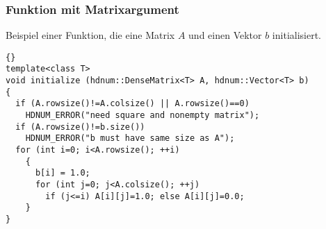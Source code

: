 \begin{frame}[fragile]
\frametitle{Funktion mit Matrixargument}
Beispiel einer Funktion, die eine Matrix $A$ und einen Vektor $b$
initialisiert.

{\footnotesize{\begin{lstlisting}{}
template<class T>
void initialize (hdnum::DenseMatrix<T> A, hdnum::Vector<T> b)
{
  if (A.rowsize()!=A.colsize() || A.rowsize()==0)
    HDNUM_ERROR("need square and nonempty matrix");
  if (A.rowsize()!=b.size())
    HDNUM_ERROR("b must have same size as A");
  for (int i=0; i<A.rowsize(); ++i)
    {
      b[i] = 1.0;
      for (int j=0; j<A.colsize(); ++j)
        if (j<=i) A[i][j]=1.0; else A[i][j]=0.0;
    }
}
\end{lstlisting}}}
\end{frame}
